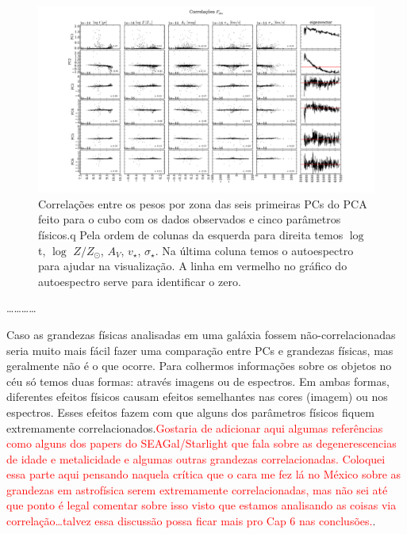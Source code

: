 \begin{figure}
    \includegraphics[width=1.3\textwidth, angle=-90]{figuras/K0277-correl-f_obs-PCvsPhys.pdf}
	\caption[Correlações PCs vs. par\^ametros f\'isicos - $F_{obs}$.]
    {Correlações entre os pesos por zona das seis primeiras PCs do PCA feito para o cubo com os dados observados e cinco
    parâmetros físicos.q Pela ordem de colunas da esquerda para direita temos $\log$ t, $\log$ $Z / Z_{\odot}$, $A_V$,
    $v_{\star}$, $\sigma_{\star}$. Na última coluna temos o autoespectro para ajudar na visualização. A linha em
    vermelho no gráfico do autoespectro serve para identificar o zero.}
    \label{fig:K0277correfobs}
\end{figure}


\ldots \dots \ldots \ldots

Caso as grandezas físicas analisadas em uma galáxia fossem não-correlacionadas seria muito mais fácil fazer uma
comparação entre PCs e grandezas físicas, mas geralmente não é o que ocorre. Para colhermos informações sobre os objetos
no céu só temos duas formas: através imagens ou de espectros. Em ambas formas, diferentes efeitos físicos causam efeitos
semelhantes nas cores (imagem) ou nos espectros. Esses efeitos fazem com que alguns dos parâmetros físicos fiquem
extremamente correlacionados.\ojo \citneed \textcolor{red}{Gostaria de adicionar aqui algumas referências como alguns
dos papers do SEAGal/Starlight que fala sobre as degenerescencias de idade e metalicidade e algumas outras grandezas
correlacionadas. Coloquei essa parte aqui pensando naquela crítica que o cara me fez lá no México sobre as grandezas em
astrofísica serem extremamente correlacionadas, mas não sei até que ponto é legal comentar sobre isso visto que
estamos analisando as coisas via correlação\ldots talvez essa discussão possa ficar mais pro Cap 6 nas conclusões.}.

